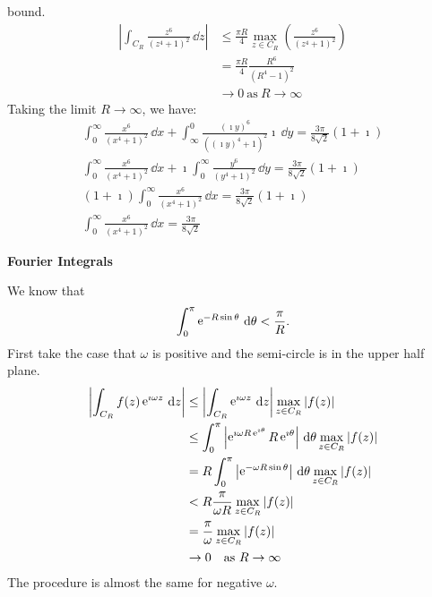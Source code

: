 {\begin{Solution}
  bound.
  \begin{align*}
    \left| \int_{C_R} \frac{ z^6 }{ (z^4 + 1)^2 } \,\dd z \right| 
    &\leq \frac{\pi R}{4} \max_{z \in C_R} 
    \left( \frac{ z^6 }{ (z^4 + 1)^2 } \right) \\
    &= \frac{\pi R}{4} \frac{ R^6 }{ (R^4 - 1)^2 } \\
    &\to 0\ \mathrm{as}\ R \to \infty
  \end{align*}
  Taking the limit $R \to \infty$, we have:
  \begin{gather*}
    \int_0^\infty \frac{ x^6 }{ (x^4 + 1)^2 } \,\dd x
    + \int_{\infty}^0 \frac{ (\imath y)^6 }{ ((\imath y)^4 + 1)^2 } \imath \,\dd y
    = \frac{3 \pi }{ 8 \sqrt{2} } (1 + \imath) \\
    \int_0^\infty \frac{ x^6 }{ (x^4 + 1)^2 } \,\dd x
    + \imath  \int_0^\infty \frac{ y^6 }{ (y^4 + 1)^2 } \,\dd y
    = \frac{3 \pi }{ 8 \sqrt{2} } (1 + \imath) \\
    (1 + \imath) \int_0^\infty \frac{ x^6 }{ (x^4 + 1)^2 } \,\dd x
    = \frac{3 \pi }{ 8 \sqrt{2} } (1 + \imath) \\
    \boxed{
      \int_0^\infty \frac{ x^6 }{ (x^4 + 1)^2 } \,\dd x
      = \frac{3 \pi }{ 8 \sqrt{2} } 
      }
  \end{gather*}
\end{Solution}





\begin{large}
  \noindent
  \textbf{Fourier Integrals}
\end{large}



\begin{Solution}
  \label{solution jordan's lemma}
  We know that
  \[
  \int_0^\pi \mathop{\mathrm{e}}\nolimits^{-R \sin\theta} \,\mathrm{d} \theta < \frac{\pi}{R}.
  \]
  First take the case that $\omega$ is positive and the semi-circle is in the
  upper half plane.
  \begin{align*}
    \left| \int_{C_R} f(z)  \mathop{\mathrm{e}}\nolimits^{\imath \omega z} \,\mathrm{d} z \right|
    &\leq \left| \int_{C_R} \mathop{\mathrm{e}}\nolimits^{\imath \omega z} \,\mathrm{d} z \right|
    \max_{z \in C_R} |f(z)| \\
    &\leq \int_0^\pi \left| \mathop{\mathrm{e}}\nolimits^{\imath \omega R \mathop{\mathrm{e}}\nolimits^{\imath \theta}} 
      R \mathop{\mathrm{e}}\nolimits^{\imath \theta} \right| \,\mathrm{d} \theta 
    \max_{z \in C_R} |f(z)| \\
    &= R \int_0^\pi \left| \mathop{\mathrm{e}}\nolimits^{- \omega R \sin \theta} \right| \,\mathrm{d} \theta 
    \max_{z \in C_R} |f(z)| \\
    &< R \frac{\pi}{\omega R}
    \max_{z \in C_R} |f(z)| \\
    &= \frac{\pi}{\omega}
    \max_{z \in C_R} |f(z)| \\
    &\to 0 \quad \mathrm{as}\ R \to \infty
  \end{align*}
  The procedure is almost the same for negative $\omega$.
\end{Solution}






}
